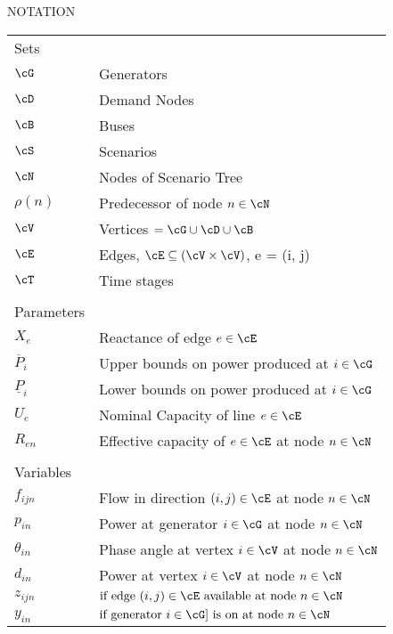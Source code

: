 
\begin{center}
NOTATION
\end{center}

\begin{tabular}{ l l }
Sets & \\
$ \cG $  &  Generators  \\
$ \cD $  & Demand Nodes \\
$ \cB  $ &  Buses \\
$ \cS  $  & Scenarios \\
$ \cN  $  & Nodes of Scenario Tree\\
$\rho \left( n \right) $  & Predecessor of node $ n \in \cN $  \\
$ \cV  $ &  Vertices $ = \cG \cup \cD \cup \cB $  \\
$ \cE  $  & Edges, $ \cE \subseteq (\cV \times \cV )$, e = (i, j)  \\
$ \cT $ & Time stages\\
 & \\
Parameters & \\
 $X_e $  & Reactance of edge $e \in \cE$  \\
$ \overline{P}_i $ & Upper bounds on power produced at $ i \in \cG $  \\
$ \underline{P}_i $ & Lower bounds on power produced at $ i \in \cG $  \\
$ U_{e} $ & Nominal Capacity of line $e \in \cE$  \\
$ R_{en} $  & Effective capacity of $e \in \cE$ at node $n \in \cN$  \\
 & \\
Variables & \\

$f_{ijn}$ & Flow in direction $(i,j) \in \cE$ at node $ n \in \cN $  \\
$p_{in} $ & Power at generator $i \in \cG$ at node $n \in \cN$  \\
$\theta_{in} $ &  Phase angle at vertex $i \in \cV$ at node $n \in \cN$  \\
$d_{in} $ &  Power at vertex $i \in \cV$ at node $n \in \cN$  \\
$z_{ijn}  $ & $  \mbox{if edge } (i,j) \in \cE \mbox{ available at node } n \in \cN $ \\
$y_{in} $ & $  \mbox{if generator } i \in \cG] \mbox{ is on at node } n \in \cN $ \\  
		

\end{tabular}
